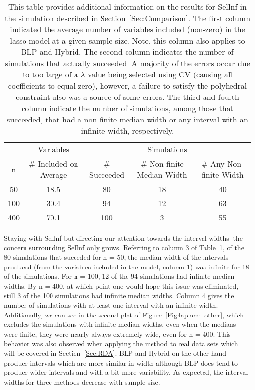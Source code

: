 \begin{table}[hb]
  \centering
  \begin{tabular}{ccccc}
  \hline
  & Variables & \multicolumn{3}{c}{Simulations} \\
  \cmidrule(lr){2-2}\cmidrule(lr){3-5}
  n & \# Included on Average & \# Succeeded & \# Non-finite Median Width & \# Any Non-finite Width \\
  \hline
  50 & 18.5 & 80 & 18 & 40 \\
  100 & 30.4 & 94 & 12 & 63 \\
  400 & 70.1 & 100 & 3 & 55 \\
  \hline
  \end{tabular}
  \caption{This table provides additional information on the results for SelInf in the simulation described in Section~\ref{Sec:Comparison}. The first column indicated the average number of variables included (non-zero) in the lasso model at a given sample size. Note, this column also applies to BLP and Hybrid. The second column indicates the number of simulations that actually succeeded. A majority of the errors occur due to too large of a $\lambda$ value being selected using CV (causing all coefficients to equal zero), however, a failure to satisfy the polyhedral constraint also was a source of some errors. The third and fourth column indicate the number of simulations, among those that succeeded, that had a non-finite median width or any interval with an infinite width, respectively.}
  \label{Tab:selective_inference}
\end{table}

Staying with SelInf but directing our attention towards the interval widths, the concern surrounding SelInf only grows. Referring to column 3 of Table~\ref{Tab:selective_inference}, of the 80 simulations that suceeded for n = 50, the median width of the intervals produced (from the variables included in the model, column 1) was infinite for 18 of the simulations. For n = 100, 12 of the 94 simulations had infinite median widths. By n = 400, at which point one would hope this issue was eliminated, still 3 of the 100 simulations had infinite median widths. Column 4 gives the number of simulations with at least one interval with an infinite width. Additionally, we can see in the second plot of Figure~\ref{Fig:laplace_other}, which excludes the simulations with infinite median widths, even when the medians were finite, they were nearly always extremely wide, even for n = 400. This behavior was also observed when applying the method to real data sets which will be covered in Section~\ref{Sec:RDA}. BLP and Hybrid on the other hand produce intervals which are more similar in width although BLP does tend to produce wider intervals and with a bit more variability. As expected, the interval widths for three methods decrease with sample size.

